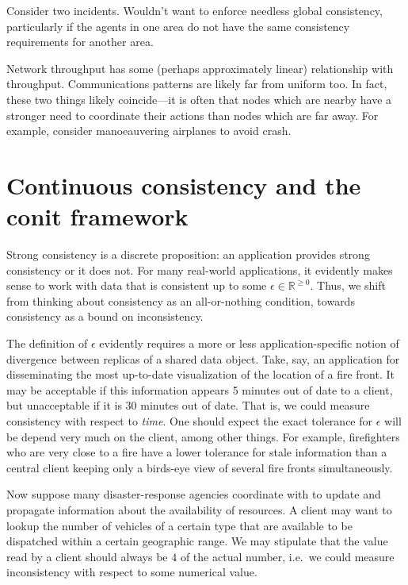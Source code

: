 \documentclass[]             %
{NASA}                       %
\theoremstyle{definition}
\begin{document}
Consider two incidents. Wouldn't want to enforce needless global
consistency, particularly if the agents in one area do not have the same
consistency requirements for another area.

Network throughput has some (perhaps approximately linear) relationship
with throughput. Communications patterns are likely far from uniform
too. In fact, these two things likely coincide---it is often that nodes
which are nearby have a stronger need to coordinate their actions than
nodes which are far away. For example, consider manoeauvering airplanes
to avoid crash.

\hypertarget{continuous-consistency-and-the-conit-framework}{%
\section{Continuous consistency and the conit
framework}\label{continuous-consistency-and-the-conit-framework}}

\label{sec:contcons}

Strong consistency is a discrete proposition: an application provides
strong consistency or it does not. For many real-world applications, it
evidently makes sense to work with data that is consistent up to some
\(\epsilon \in \mathbb{R}^{\geq 0}\). Thus, we shift from thinking about
consistency as an all-or-nothing condition, towards consistency as a
bound on inconsistency.

The definition of \(\epsilon\) evidently requires a more or less
application-specific notion of divergence between replicas of a shared
data object. Take, say, an application for disseminating the most
up-to-date visualization of the location of a fire front. It may be
acceptable if this information appears 5 minutes out of date to a
client, but unacceptable if it is 30 minutes out of date. That is, we
could measure consistency with respect to \emph{time}. One should expect
the exact tolerance for \(\epsilon\) will be depend very much on the
client, among other things. For example, firefighters who are very close
to a fire have a lower tolerance for stale information than a central
client keeping only a birds-eye view of several fire fronts
simultaneously.

Now suppose many disaster-response agencies coordinate with to update
and propagate information about the availability of resources. A client
may want to lookup the number of vehicles of a certain type that are
available to be dispatched within a certain geographic range. We may
stipulate that the value read by a client should always be \(4\) of the
actual number, i.e.~we could measure inconsistency with respect to some
numerical value.
\end{document}
